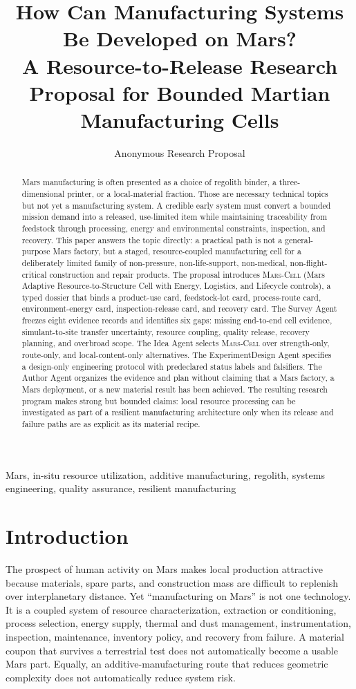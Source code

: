 \documentclass[conference]{../../../../Conference-LaTeX-template_10-17-19/IEEEtran}
\title{How Can Manufacturing Systems Be Developed on Mars?\\
\large A Resource-to-Release Research Proposal for Bounded Martian Manufacturing Cells}
\author{Anonymous Research Proposal}
\newcommand{\marscell}{\textsc{Mars-Cell}}
\begin{document}
\maketitle

\begin{abstract}
Mars manufacturing is often presented as a choice of regolith binder, a three-dimensional printer, or a local-material fraction. Those are necessary technical topics but not yet a manufacturing system. A credible early system must convert a bounded mission demand into a released, use-limited item while maintaining traceability from feedstock through processing, energy and environmental constraints, inspection, and recovery. This paper answers the topic directly: a practical path is not a general-purpose Mars factory, but a staged, resource-coupled manufacturing cell for a deliberately limited family of non-pressure, non-life-support, non-medical, non-flight-critical construction and repair products. The proposal introduces \marscell{} (Mars Adaptive Resource-to-Structure Cell with Energy, Logistics, and Lifecycle controls), a typed dossier that binds a product-use card, feedstock-lot card, process-route card, environment-energy card, inspection-release card, and recovery card. The Survey Agent freezes eight evidence records and identifies six gaps: missing end-to-end cell evidence, simulant-to-site transfer uncertainty, resource coupling, quality release, recovery planning, and overbroad scope. The Idea Agent selects \marscell{} over strength-only, route-only, and local-content-only alternatives. The ExperimentDesign Agent specifies a design-only engineering protocol with predeclared status labels and falsifiers. The Author Agent organizes the evidence and plan without claiming that a Mars factory, a Mars deployment, or a new material result has been achieved. The resulting research program makes strong but bounded claims: local resource processing can be investigated as part of a resilient manufacturing architecture only when its release and failure paths are as explicit as its material recipe.
\end{abstract}

\begin{IEEEkeywords}
Mars, in-situ resource utilization, additive manufacturing, regolith, systems engineering, quality assurance, resilient manufacturing
\end{IEEEkeywords}

\section{Introduction}
The prospect of human activity on Mars makes local production attractive because materials, spare parts, and construction mass are difficult to replenish over interplanetary distance. Yet ``manufacturing on Mars'' is not one technology. It is a coupled system of resource characterization, extraction or conditioning, process selection, energy supply, thermal and dust management, instrumentation, inspection, maintenance, inventory policy, and recovery from failure. A material coupon that survives a terrestrial test does not automatically become a usable Mars part. Equally, an additive-manufacturing route that reduces geometric complexity does not automatically reduce system risk.
\end{document}
